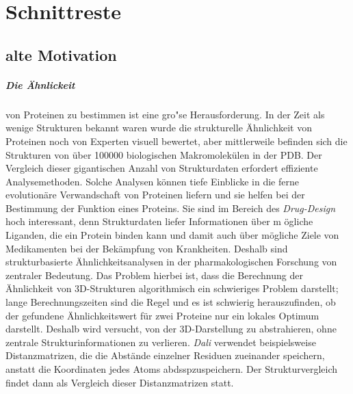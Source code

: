 \documentclass{report}
\begin{document}
\chapter{Schnittreste}

\section{alte Motivation}

\paragraph{Die \"Ahnlickeit} von Proteinen zu bestimmen ist eine gro"se Herausforderung. In der Zeit als wenige Strukturen bekannt waren wurde die strukturelle \"Ahnlichkeit von Proteinen noch von Experten visuell bewertet, aber mittlerweile befinden sich die Strukturen von \"uber 100000 biologischen Makromolek\"ulen in der PDB. Der Vergleich dieser gigantischen Anzahl von Strukturdaten erfordert effiziente Analysemethoden. Solche Analysen k\"onnen tiefe Einblicke in die ferne evolution\"are Verwandschaft von Proteinen liefern und sie helfen bei der Bestimmung der Funktion eines Proteins. Sie sind im Bereich des \textit{Drug-Design} hoch interessant, denn  Strukturdaten liefer Informationen \"uber m \"ogliche Liganden, die ein Protein binden kann und damit auch \"uber m\"ogliche Ziele von Medikamenten bei der Bek\"ampfung von Krankheiten. Deshalb sind strukturbasierte \"Ahnlichkeitsanalysen in der pharmakologischen Forschung von zentraler Bedeutung.
Das Problem hierbei ist, dass die Berechnung der \"Ahnlichkeit von 3D-Strukturen algorithmisch ein schwieriges Problem darstellt; lange Berechnungszeiten sind die Regel und es ist schwierig herauszufinden, ob der gefundene \"Ahnlichkeitswert f\"ur zwei Proteine nur ein lokales Optimum darstellt.
Deshalb wird versucht, von der 3D-Darstellung zu abstrahieren, ohne zentrale Strukturinformationen zu verlieren. \emph{Dali} \cite{dali}verwendet beispielsweise Distanzmatrizen, die die Abst\"ande einzelner Residuen zueinander speichern, anstatt die Koordinaten jedes Atoms abdsspzuspeichern.
Der Strukturvergleich findet dann als Vergleich dieser Distanzmatrizen statt.
\end{document}
